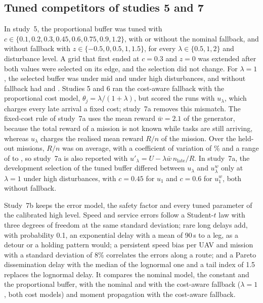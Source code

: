 \subsection{Tuned competitors of studies 5 and 7}
In study~5, the proportional buffer was tuned with $c\in\{0.1,0.2,0.3,0.45,0.6,0.75,0.9,1.2\}$, with or without the
nominal fallback, and \mname{} without fallback with $z\in\{-0.5,0,0.5,1,1.5\}$, for every $\lambda\in\{0.5,1,2\}$ and
disturbance level. A grid that first ended at $c=0.3$ and $z=0$ was extended after both values were selected on its
edge, and the selection did not change. For $\lambda=1$, the selected buffer was  under mid and
 under high disturbances, and \mname{} without fallback had  and
. Studies 5 and 6 ran the cost-aware fallback with the proportional cost model,
$\theta_j=\lambda/(1+\lambda)$, but scored the runs with $u_\lambda$, which charges every late arrival a fixed cost;
study~7a removes this mismatch. The fixed-cost rule of study~7a uses the mean reward $\bar w=2.1$ of the generator,
because the total reward of a mission is not known while tasks are still arriving, whereas $u_\lambda$ charges the
realised mean reward $R/n$ of the mission. Over the held-out missions, $R/n$ was  on average, with a
coefficient of variation of \% and a range of  to , so study~7a is also reported
with $u'_\lambda=U-\lambda\bar w\,n_{\mathrm{late}}/R$. In study~7a, the development selection of the tuned buffer
differed between $u_\lambda$ and $u^w_\lambda$ only at $\lambda=1$ under high disturbances, with $c=0.45$ for $u_1$ and
$c=0.6$ for $u^w_1$, both without fallback.

Study~7b keeps the error model, the safety factor and every tuned parameter of the calibrated high level. Speed and
service errors follow a Student-$t$ law with three degrees of freedom at the same standard deviation; rare long delays
add, with probability 0.1, an exponential delay with a mean of 90\,s to a leg, as a detour or a holding pattern would; a
persistent speed bias per UAV and mission with a standard deviation of 8\% correlates the errors along a route; and a
Pareto dissemination delay with the median of the lognormal one and a tail index of 1.5 replaces the lognormal delay.
It compares the nominal model, the constant and the proportional buffer, \mname{} with the nominal and with the
cost-aware fallback ($\lambda=1$, both cost models) and moment propagation with the cost-aware fallback.


